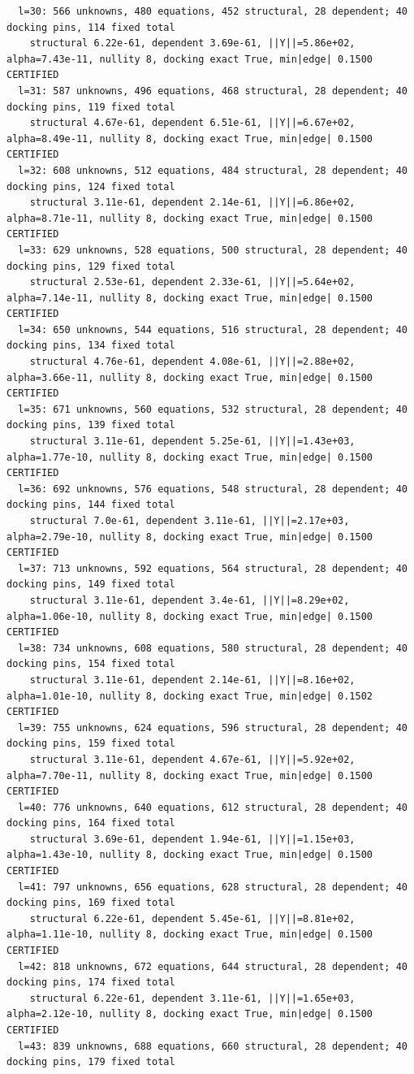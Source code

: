 \documentclass[11pt]{article}
\begin{document}
\begin{verbatim}
  l=30: 566 unknowns, 480 equations, 452 structural, 28 dependent; 40 docking pins, 114 fixed total
    structural 6.22e-61, dependent 3.69e-61, ||Y||=5.86e+02, alpha=7.43e-11, nullity 8, docking exact True, min|edge| 0.1500  CERTIFIED
  l=31: 587 unknowns, 496 equations, 468 structural, 28 dependent; 40 docking pins, 119 fixed total
    structural 4.67e-61, dependent 6.51e-61, ||Y||=6.67e+02, alpha=8.49e-11, nullity 8, docking exact True, min|edge| 0.1500  CERTIFIED
  l=32: 608 unknowns, 512 equations, 484 structural, 28 dependent; 40 docking pins, 124 fixed total
    structural 3.11e-61, dependent 2.14e-61, ||Y||=6.86e+02, alpha=8.71e-11, nullity 8, docking exact True, min|edge| 0.1500  CERTIFIED
  l=33: 629 unknowns, 528 equations, 500 structural, 28 dependent; 40 docking pins, 129 fixed total
    structural 2.53e-61, dependent 2.33e-61, ||Y||=5.64e+02, alpha=7.14e-11, nullity 8, docking exact True, min|edge| 0.1500  CERTIFIED
  l=34: 650 unknowns, 544 equations, 516 structural, 28 dependent; 40 docking pins, 134 fixed total
    structural 4.76e-61, dependent 4.08e-61, ||Y||=2.88e+02, alpha=3.66e-11, nullity 8, docking exact True, min|edge| 0.1500  CERTIFIED
  l=35: 671 unknowns, 560 equations, 532 structural, 28 dependent; 40 docking pins, 139 fixed total
    structural 3.11e-61, dependent 5.25e-61, ||Y||=1.43e+03, alpha=1.77e-10, nullity 8, docking exact True, min|edge| 0.1500  CERTIFIED
  l=36: 692 unknowns, 576 equations, 548 structural, 28 dependent; 40 docking pins, 144 fixed total
    structural 7.0e-61, dependent 3.11e-61, ||Y||=2.17e+03, alpha=2.79e-10, nullity 8, docking exact True, min|edge| 0.1500  CERTIFIED
  l=37: 713 unknowns, 592 equations, 564 structural, 28 dependent; 40 docking pins, 149 fixed total
    structural 3.11e-61, dependent 3.4e-61, ||Y||=8.29e+02, alpha=1.06e-10, nullity 8, docking exact True, min|edge| 0.1500  CERTIFIED
  l=38: 734 unknowns, 608 equations, 580 structural, 28 dependent; 40 docking pins, 154 fixed total
    structural 3.11e-61, dependent 2.14e-61, ||Y||=8.16e+02, alpha=1.01e-10, nullity 8, docking exact True, min|edge| 0.1502  CERTIFIED
  l=39: 755 unknowns, 624 equations, 596 structural, 28 dependent; 40 docking pins, 159 fixed total
    structural 3.11e-61, dependent 4.67e-61, ||Y||=5.92e+02, alpha=7.70e-11, nullity 8, docking exact True, min|edge| 0.1500  CERTIFIED
  l=40: 776 unknowns, 640 equations, 612 structural, 28 dependent; 40 docking pins, 164 fixed total
    structural 3.69e-61, dependent 1.94e-61, ||Y||=1.15e+03, alpha=1.43e-10, nullity 8, docking exact True, min|edge| 0.1500  CERTIFIED
  l=41: 797 unknowns, 656 equations, 628 structural, 28 dependent; 40 docking pins, 169 fixed total
    structural 6.22e-61, dependent 5.45e-61, ||Y||=8.81e+02, alpha=1.11e-10, nullity 8, docking exact True, min|edge| 0.1500  CERTIFIED
  l=42: 818 unknowns, 672 equations, 644 structural, 28 dependent; 40 docking pins, 174 fixed total
    structural 6.22e-61, dependent 3.11e-61, ||Y||=1.65e+03, alpha=2.12e-10, nullity 8, docking exact True, min|edge| 0.1500  CERTIFIED
  l=43: 839 unknowns, 688 equations, 660 structural, 28 dependent; 40 docking pins, 179 fixed total
\end{verbatim}\endgroup
\end{document}
